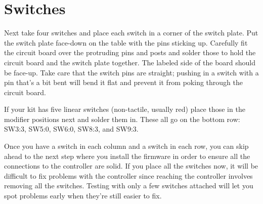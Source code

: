 \documentclass{article}
\begin{document}
\section{Switches}

\noindent{}

\vspace{1em}

Next take four switches and place each switch in a corner of the
switch plate. Put the switch plate face-down on the table with the
pins sticking up. Carefully fit the circuit board over the protruding
pins and posts and solder those to hold the circuit board and the
switch plate together. The labeled side of the board should be
face-up. Take care that the switch pins are straight; pushing in a
switch with a pin that's a bit bent will bend it flat and prevent it
from poking through the circuit board.

\vspace{1em}

If your kit has five linear switches (non-tactile, usually red) place
those in the modifier positions next and solder them in. These all go
on the bottom row: SW3:3, SW5:0, SW6:0, SW8:3, and SW9:3.

\vspace{1em}

Once you have a switch in each column and a switch in each row, you
can skip ahead to the next step where you install the firmware in
order to ensure all the connections to the controller are solid. If
you place all the switches now, it will be difficult to fix problems
with the controller since reaching the controller involves removing
all the switches. Testing with only a few switches attached will let
you spot problems early when they're still easier to fix.

\vspace{1em}
\noindent{}
\vspace{1em}
\end{document}
